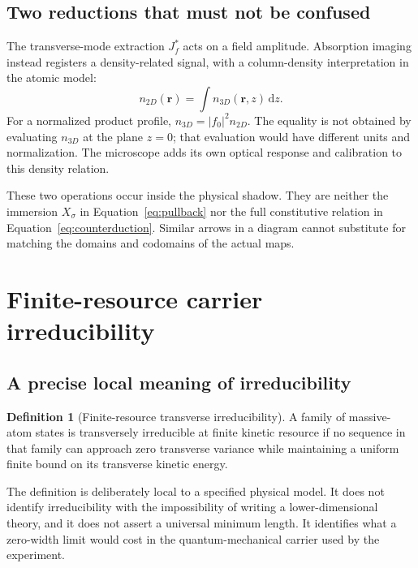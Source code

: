 \documentclass[11pt,a4paper]{article}
\theoremstyle{definition}
\newtheorem{definition}[proposition]{Definition}
\theoremstyle{remark}
\newcommand{\dd}{\mathrm{d}}
\begin{document}
\subsection{Two reductions that must not be confused}
The transverse-mode extraction $J_f^*$ acts on a field amplitude. Absorption imaging instead registers a density-related signal, with a column-density interpretation in the atomic model:
\begin{equation}
 n_{2D}(\boldsymbol r)
 =\int n_{3D}(\boldsymbol r,z)\,\dd z.
 \label{eq:column}
\end{equation}
For a normalized product profile, $n_{3D}=|f_0|^2n_{2D}$. The equality is not obtained by evaluating $n_{3D}$ at the plane $z=0$; that evaluation would have different units and normalization. The microscope adds its own optical response and calibration to this density relation.\cite{zhang2026,hung}

These two operations occur inside the physical shadow. They are neither the immersion $X_\sigma$ in Equation~\eqref{eq:pullback} nor the full constitutive relation in Equation~\eqref{eq:counterduction}. Similar arrows in a diagram cannot substitute for matching the domains and codomains of the actual maps.\cite{foundation}

\section{Finite-resource carrier irreducibility}
\label{sec:irreducibility}
\subsection{A precise local meaning of irreducibility}
\begin{definition}[Finite-resource transverse irreducibility]
A family of massive-atom states is transversely irreducible at finite kinetic resource if no sequence in that family can approach zero transverse variance while maintaining a uniform finite bound on its transverse kinetic energy.
\end{definition}
The definition is deliberately local to a specified physical model. It does not identify irreducibility with the impossibility of writing a lower-dimensional theory, and it does not assert a universal minimum length. It identifies what a zero-width limit would cost in the quantum-mechanical carrier used by the experiment.
\end{document}
